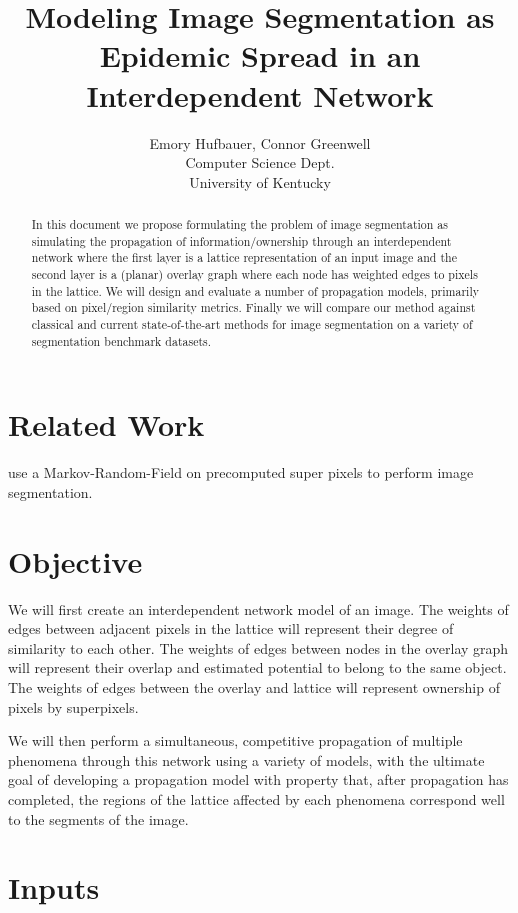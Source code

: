 \documentclass[twocolumn]{article}
\title{Modeling Image Segmentation as Epidemic Spread in an Interdependent Network}
\author{
  Emory Hufbauer, Connor Greenwell \\
  Computer Science Dept. \\
  University of Kentucky
}
\date{}
\begin{document}
\maketitle

\begin{abstract}
In this document we propose formulating the problem of image segmentation as simulating the propagation of
information/ownership through an interdependent network where the first layer is a lattice representation of an input image
and the second layer is a (planar) overlay graph where each node has weighted edges to pixels in the lattice. We will design
and evaluate a number of propagation models, primarily based on pixel/region similarity metrics. Finally we will compare our
method against classical and current state-of-the-art methods for image segmentation on a variety of segmentation benchmark
datasets. 
\end{abstract}

\section{Related Work}

\cite{pei2014saliency} use a Markov-Random-Field on precomputed super pixels to perform image segmentation.

\section{Objective}

We will first create an interdependent network model of an image. The weights of edges between adjacent pixels in the lattice
will represent their degree of similarity to each other. The weights of edges between nodes in the overlay graph will
represent their overlap and estimated potential to belong to the same object. The weights of edges between the overlay and
lattice will represent ownership of pixels by superpixels.

We will then perform a simultaneous, competitive propagation of multiple phenomena through this network using a variety of
models, with the ultimate goal of developing a propagation model with property that, after propagation has completed, the
regions of the lattice affected by each phenomena correspond well to the segments of the image.

\section{Inputs}
\end{document}

